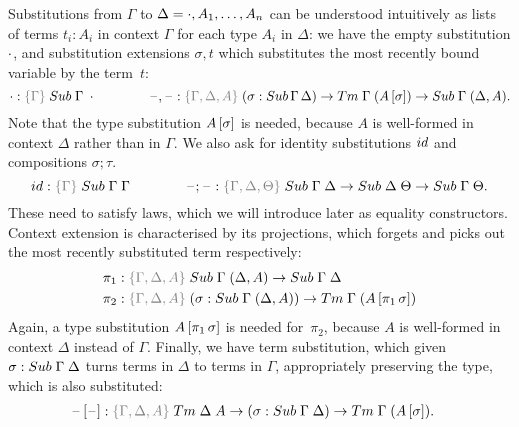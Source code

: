 \documentclass[a4paper,UKenglish,numberwithinsect,cleveref,thm-restate]{lipics-v2021}
\begin{document}
Substitutions from $\Gamma$ to $\Delta = \cdot, A_1, \ldots, A_n$ can be understood intuitively as lists of terms $t_i : A_i$ in context $\Gamma$ for each type $A_i$ in $\Delta$: we have the empty substitution $\cdot$, and substitution extensions $\sigma, t$ which substitutes the most recently bound variable by the term~$t$:
\[
  \emptysub : \implicit{\Gamma}\;\Sub\;\Gamma\;\emptyctx
  \qquad\qquad
  \blank,\blank : \implicit{\Gamma, \Delta, A}\; (\sigma : \Sub\,\Gamma\,\Delta) \to \Tm\;\Gamma\;(\sub{A}{\sigma}) \to \Sub\;\Gamma\;(\Delta, A).
\]
Note that the type substitution ${A}\,[\sigma]$ is needed, because $A$ is well-formed in context $\Delta$ rather than in $\Gamma$.
We also ask for identity substitutions $\idS$ and compositions $\sigma;\tau$.
\[
  \idS : \implicit{\Gamma}\; \Sub\;\Gamma\;\Gamma
  \qquad\qquad \blank;\blank : \implicit{\Gamma, \Delta, \Theta}\;\Sub\;\Gamma\;\Delta \to \Sub\;\Delta\;\Theta \to \Sub\;\Gamma\;\Theta.
\]
These need to satisfy laws, which we will introduce later as equality constructors.
Context extension is characterised by its projections, which forgets and picks out the most recently substituted term respectively:
\begin{alignat*}{3}
  \pi_1 & : \implicit{\Gamma, \Delta, A}\;\Sub\;\Gamma\;(\Delta, A) \to \Sub\;\Gamma\;\Delta \\
  \pi_2 & : \implicit{\Gamma, \Delta, A}\;(\sigma : \Sub\;\Gamma\;(\Delta, A)) \to \Tm\;\Gamma\;(\sub{A}{\pi_1\,\sigma})
\end{alignat*}
%
Again, a type substitution ${A}\,[\pi_1\,\sigma]$ is needed for~$\pi_2$, because $A$ is well-formed in context $\Delta$ instead of $\Gamma$.
Finally, we have term substitution, which given $\sigma : \Sub\;\Gamma\;\Delta$ turns terms in $\Delta$ to terms in $\Gamma$, appropriately preserving the type, which is also substituted:
\begin{alignat*}{3}
  \sub{\blank}{\blank} & : \implicit{\Gamma,\Delta, A}\;\Tm\;\Delta\;A \to (\sigma : \Sub\;\Gamma\;\Delta) \to \Tm\;\Gamma\;(\sub{A}{\sigma}).
\end{alignat*}
\end{document}
